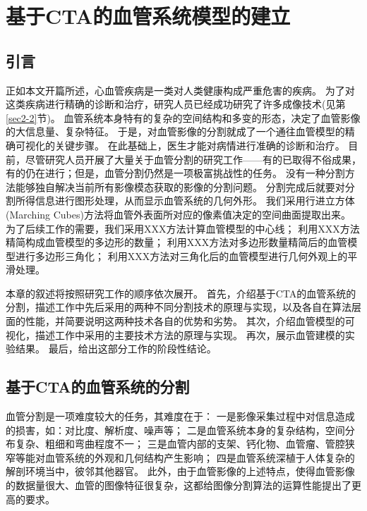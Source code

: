 \chapter{基于CTA的血管系统模型的建立}
\label{chap3} \fontsize{12pt}{12pt}\selectfont

\section{引言}

正如本文开篇所述，心血管疾病是一类对人类健康构成严重危害的疾病。
为了对这类疾病进行精确的诊断和治疗，研究人员已经成功研究了许多成像技术(见第\ref{sec2-2}节)。
血管系统本身特有的复杂的空间结构和多变的形态，决定了血管影像的大信息量、复杂特征。
于是，对血管影像的分割就成了一个通往血管模型的精确可视化的关键步骤。
在此基础上，医生才能对病情进行准确的诊断和治疗。
目前，尽管研究人员开展了大量关于血管分割的研究工作——有的已取得不俗成果，有的仍在进行；但是，血管分割仍然是一项极富挑战性的任务\cite{Lesage2009Review}。
没有一种分割方法能够独自解决当前所有影像模态获取的影像的分割问题。
分割完成后就要对分割所得信息进行图形处理，从而显示血管系统的几何外形。
我们采用行进立方体(Marching Cubes)方法\cite{Lorensen1987MC}将血管外表面所对应的像素值决定的空间曲面提取出来。
为了后续工作的需要，我们采用XXX方法计算血管模型的中心线；
利用XXX方法精简构成血管模型的多边形的数量；
利用XXX方法对多边形数量精简后的血管模型进行多边形三角化；
利用XXX方法对三角化后的血管模型进行几何外观上的平滑处理。

本章的叙述将按照研究工作的顺序依次展开。
首先，介绍基于CTA的血管系统的分割，描述工作中先后采用的两种不同分割技术的原理与实现，以及各自在算法层面的性能，并简要说明这两种技术各自的优势和劣势。
其次，介绍血管模型的可视化，描述工作中采用的主要技术方法的原理与实现。
再次，展示血管建模的实验结果。
最后，给出这部分工作的阶段性结论。

\section{基于CTA的血管系统的分割}

血管分割是一项难度较大的任务，其难度在于\cite{Lesage2009Review}：
一是影像采集过程中对信息造成的损害，如：对比度、解析度、噪声等；
二是血管系统本身的复杂结构，空间分布复杂、粗细和弯曲程度不一；
三是血管内部的支架、钙化物、血管瘤、管腔狭窄等能对血管系统的外观和几何结构产生影响；
四是血管系统深植于人体复杂的解剖环境当中，彼邻其他器官。
此外，由于血管影像的上述特点，使得血管影像的数据量很大、血管的图像特征很复杂，这都给图像分割算法的运算性能提出了更高的要求。

